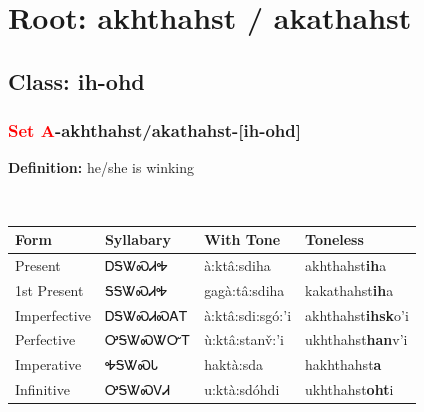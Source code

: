 \needspace{4in}
\section*{Root: akhthahst / akathahst}
\nopagebreak
{}
\needspace{3in}
\subsection*{Class: ih-ohd}
\nopagebreak
\needspace{2in}
\subsubsection*{\textcolor{Red}{Set A}{-}\textbf{akhthahst/akathahst}{-}[ih-ohd]}
\nopagebreak
\textbf{Definition: } he/she is winking
\\[0.5em]
\begin{tabularx}{\textwidth}{l X X X}%
\toprule%
\textbf{Form}&\textbf{Syllabary}&\textbf{With Tone}&\textbf{Toneless}\\%
\midrule%
Present&ᎠᎦᏔᏍᏗᎭ&à:ktâ:sdiha&akhthahst\textbf{ih}a\\%
1st Present&ᎦᎦᏔᏍᏗᎭ&gagà:tâ:sdiha&kakathahst\textbf{ih}a\\%
Imperfective&ᎠᎦᏔᏍᏗᏍᎪᎢ&à:ktâ:sdi:sgó:’i&akhthahst\textbf{ihsk}o'i\\%
Perfective&ᎤᎦᏔᏍᏔᏅᎢ&ù:ktâ:stanv̌:’i&ukhthahst\textbf{han}v'i\\%
Imperative&ᎭᎦᏔᏍᏓ&haktà:sda&hakhthahst\textbf{a}\\%
Infinitive&ᎤᎦᏔᏍᏙᏗ&u:ktà:sdóhdi&ukhthahst\textbf{oht}i\\%
\bottomrule%
\end{tabularx}
\\[1em]
\needspace{2in}
